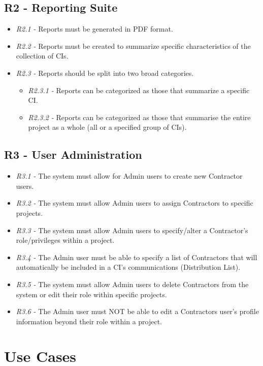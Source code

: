 \documentclass[11pt]{article}
\begin{document}
\subsection{R2 - Reporting Suite}
\begin{itemize}
    \item \textit{R2.1 -} Reports must be generated in PDF format.
    \item \textit{R2.2 -} Reports must be created to summarize specific characteristics of the collection of CIs.
    \item \textit{R2.3 -} Reports should be split into two broad categories.
    \begin{itemize}
        \item \textit{R2.3.1 -} Reports can be categorized as those that summarize a specific CI.
        \item \textit{R2.3.2 -} Reports can be categorized as those that summarise the entire project as a whole (all or a specified group of CIs).
    \end{itemize}
\end{itemize}
\subsection{R3 - User Administration}
\begin{itemize}
    \item \textit{R3.1 -} The system must allow for Admin users to create new Contractor users.
    \item \textit{R3.2 -} The system must allow Admin users to assign Contractors to specific projects.
    \item \textit{R3.3 -} The system must allow Admin users to specify/alter a Contractor's role/privileges within a project.
    \item \textit{R3.4 -} The Admin user must be able to specify a list of Contractors that will automatically be included in a CI's communications (Distribution List).
    \item \textit{R3.5 -} The system must allow Admin users to delete Contractors from the system or edit their role within specific projects.
    \item \textit{R3.6 -} The Admin user must NOT be able to edit a Contractors user's profile information beyond their role within a project.
\end{itemize}

\section{Use Cases}
\end{document}
